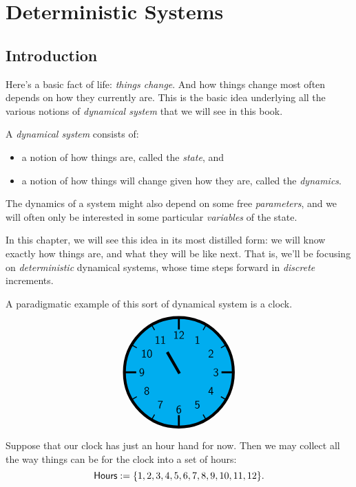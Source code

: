\documentclass[DynamicalBook]{subfiles}
\begin{document}
%




\setcounter{chapter}{0}%


\chapter{Deterministic Systems}\label{chapter.1}

\section{Introduction}

Here's a basic fact of life: \emph{things change}. And how things change most
often depends on how they currently are. This is the basic idea underlying all the various notions of \emph{dynamical
  system} that we will see in this book.

\begin{informal}
  A \emph{dynamical system} consists of:
  \begin{itemize}
  \item a notion of how things are, called the \emph{state}, and
  \item a notion of how things will change given how they are, called the \emph{dynamics}.
  \end{itemize}
  The dynamics of a system might also depend on some free \emph{parameters}, and
  we will often only be interested in some particular \emph{variables} of the
  state. 
\end{informal}

In this chapter, we will see this idea in its
most distilled form: we will know exactly how things are, and what they will be
like next. That is, we'll be focusing on \emph{deterministic} dynamical systems,
whose time steps forward in \emph{discrete} increments.


A paradigmatic example of this sort of dynamical system is a clock.
\[
\begin{tikzpicture}[line cap=rect,line width=3pt]
\filldraw [fill=cyan] (0,0) circle [radius=2cm];
\foreach \angle [count=\xi] in {60,30,...,-270}
{
  \draw[line width=1pt] (\angle:1.8cm) -- (\angle:2cm);
  \node[font=\large] at (\angle:1.36cm) {\textsf{\xi}};
}
\foreach \angle in {0,90,180,270}
  \draw[line width=2pt] (\angle:1.6cm) -- (\angle:2cm);
\draw (0,0) -- (120:0.8cm);
\end{tikzpicture}
\]

Suppose that our clock has just an hour hand for now. Then we may collect all
the way things can be for the clock into a set of hours:
$$\mathsf{Hours} := \{1, 2, 3, 4, 5, 6, 7, 8, 9, 10, 11, 12\}.$$
\end{document}

